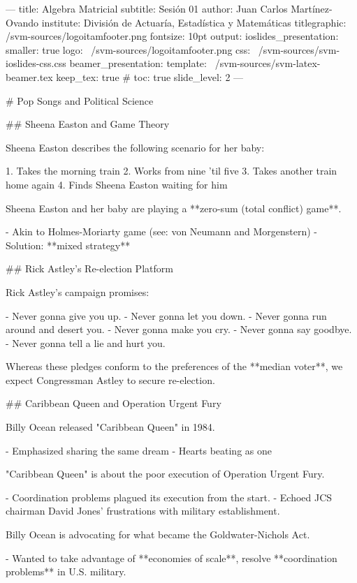---
title: Algebra Matricial
subtitle: Sesión 01
author: Juan Carlos Martínez-Ovando
institute: División de Actuaría, Estadística y Matemáticas
titlegraphic: /svm-sources/logoitamfooter.png
fontsize: 10pt
output:
 ioslides_presentation:
    smaller: true
    logo: ~/svm-sources/logoitamfooter.png
    css: ~/svm-sources/svm-ioslides-css.css    
 beamer_presentation:
    template: ~/svm-sources/svm-latex-beamer.tex
    keep_tex: true
# toc: true
    slide_level: 2
---




# Pop Songs and Political Science

## Sheena Easton and Game Theory

Sheena Easton describes the following scenario for her baby:

1. Takes the morning train
2. Works from nine 'til five
3. Takes another train home again
4. Finds Sheena Easton waiting for him

Sheena Easton and her baby are playing a **zero-sum (total conflict) game**.

- Akin to Holmes-Moriarty game (see: von Neumann and Morgenstern)
- Solution: **mixed strategy**

## Rick Astley's Re-election Platform

Rick Astley's campaign promises:

- Never gonna give you up.
- Never gonna let you down.
- Never gonna run around and desert you.
- Never gonna make you cry.
- Never gonna say goodbye.
- Never gonna tell a lie and hurt you.

Whereas these pledges conform to the preferences of the **median voter**, we expect Congressman Astley to secure re-election.

## Caribbean Queen and Operation Urgent Fury

Billy Ocean released "Caribbean Queen" in 1984.

- Emphasized sharing the same dream
- Hearts beating as one

"Caribbean Queen" is about the poor execution of Operation Urgent Fury.

- Coordination problems plagued its execution from the start.
- Echoed JCS chairman David Jones' frustrations with military establishment.

Billy Ocean is advocating for what became the Goldwater-Nichols Act.

- Wanted to take advantage of **economies of scale**, resolve **coordination problems** in U.S. military.

